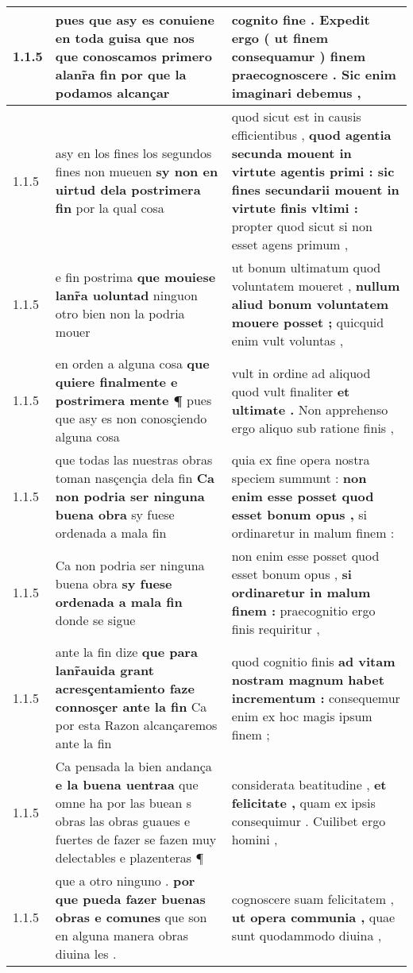 \begin{tabular}{|p{1cm}|p{6.5cm}|p{6.5cm}|}
1.1.5 & pues que asy es conuiene en toda guisa \textbf{ que nos que conoscamos primero alanr̃a fin } por que la podamos alcançar & cognito fine . \textbf{ Expedit ergo } ( ut finem consequamur ) finem praecognoscere . Sic enim imaginari debemus , \\\hline
1.1.5 & asy en los fines los segundos fines non mueuen \textbf{ sy non en uirtud dela postrimera fin } por la qual cosa & quod sicut est in causis efficientibus , \textbf{ quod agentia secunda mouent in virtute agentis primi : sic fines secundarii mouent in virtute finis vltimi : } propter quod sicut si non esset agens primum , \\\hline
1.1.5 & e fin postrima \textbf{ que mouiese lanr̃a uoluntad } ninguon otro bien non la podria mouer & ut bonum ultimatum quod voluntatem moueret , \textbf{ nullum aliud bonum voluntatem mouere posset ; } quicquid enim vult voluntas , \\\hline
1.1.5 & en orden a alguna cosa \textbf{ que quiere finalmente e postrimera mente ¶ } pues que asy es non conosçiendo alguna cosa & vult in ordine ad aliquod quod vult finaliter \textbf{ et ultimate . } Non apprehenso ergo aliquo sub ratione finis , \\\hline
1.1.5 & que todas las nuestras obras toman nasçençia dela fin \textbf{ Ca non podria ser ninguna buena obra } sy fuese ordenada a mala fin & quia ex fine opera nostra speciem summunt : \textbf{ non enim esse posset quod esset bonum opus , } si ordinaretur in malum finem : \\\hline
1.1.5 & Ca non podria ser ninguna buena obra \textbf{ sy fuese ordenada a mala fin } donde se sigue & non enim esse posset quod esset bonum opus , \textbf{ si ordinaretur in malum finem : } praecognitio ergo finis requiritur , \\\hline
1.1.5 & ante la fin dize \textbf{ que para lanr̃auida grant acresçentamiento faze connosçer ante la fin } Ca por esta Razon alcançaremos ante la fin & quod cognitio finis \textbf{ ad vitam nostram magnum habet incrementum : } consequemur enim ex hoc magis ipsum finem ; \\\hline
1.1.5 & Ca pensada la bien andança \textbf{ e la buena uentraa } que omne ha por las buean s obras las obras guaues e fuertes de fazer se fazen muy delectables e plazenteras ¶ & considerata beatitudine , \textbf{ et felicitate , } quam ex ipsis consequimur . Cuilibet ergo homini , \\\hline
1.1.5 & que a otro ninguno . \textbf{ por que pueda fazer buenas obras e comunes } que son en alguna manera obras diuina les . & cognoscere suam felicitatem , \textbf{ ut opera communia , } quae sunt quodammodo diuina , \\\hline

\end{tabular}
